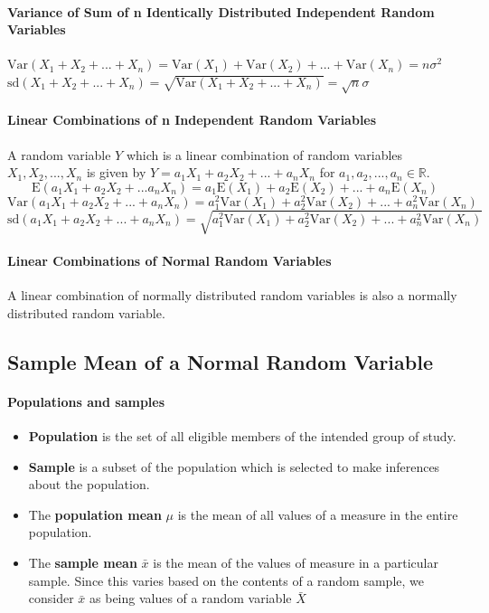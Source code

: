 \documentclass[a4paper,twoside]{article}
\begin{document}
			\paragraph{Variance of Sum of n Identically Distributed Independent Random Variables} $\displaystyle\mathrm{Var}(X_1+X_2+...+X_n)=\mathrm{Var}(X_1)+\mathrm{Var}(X_2)+...+\mathrm{Var}(X_n)=n\sigma^2$\\
			$\displaystyle\mathrm{sd}(X_1+X_2+...+X_n)=\sqrt{\mathrm{Var}(X_1+X_2+...+X_n)}=\sqrt{n}\sigma$
			
			\paragraph{Linear Combinations of n Independent Random Variables} A random variable $Y$ which is a linear combination of random variables $X_1,X_2,...,X_n$ is given by $Y=a_1X_1+a_2X_2+...+a_nX_n$ for $a_1,a_2,...,a_n\in\mathbb{R}$.
			\[
				\mathrm{E}(a_1X_1+a_2X_2+...a_nX_n)=a_1\mathrm{E}(X_1)+a_2\mathrm{E}(X_2)+...+a_n\mathrm{E}(X_n)
			\]
			\[
				\mathrm{Var}(a_1X_1+a_2X_2+...+a_nX_n)=a_1^2\mathrm{Var}(X_1)+a_2^2\mathrm{Var}(X_2)+...+a_n^2\mathrm{Var}(X_n)
			\]
			\[
				\mathrm{sd}(a_1X_1+a_2X_2+...+a_nX_n)=\sqrt{a_1^2\mathrm{Var}(X_1)+a_2^2\mathrm{Var}(X_2)+...+a_n^2\mathrm{Var}(X_n)}
			\]
		
			\paragraph{Linear Combinations of Normal Random Variables} A linear combination of normally distributed random variables is also a normally distributed random variable.
		\subsection{Sample Mean of a Normal Random Variable}
			\paragraph{Populations and samples}
				\begin{itemize}
					\item \textbf{Population} is the set of all eligible members of the intended group of study.
					\item \textbf{Sample} is a subset of the population which is selected to make inferences about the population.
					\item The \textbf{population mean} $\mu$ is the mean of all values of a measure in the entire population.
					\item The \textbf{sample mean} $\bar{x}$ is the mean of the values of measure in a particular sample. Since this varies based on the contents of a random sample, we consider $\bar{x}$ as being values of a random variable $\bar{X}$
				\end{itemize}
			
\end{document}
